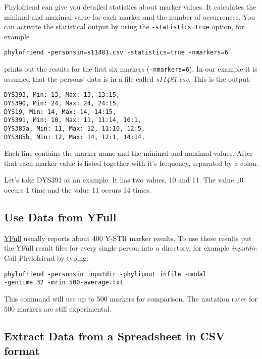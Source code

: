 Phylofriend can give you detailed statistics about marker
values. It calculates the minimal and maximal value for each
marker and the number of occurrences. You can activate the
statistical output by using the \texttt{-statistics=true}
option, for example

\vspace{1ex}
\noindent\texttt{phylofriend -personsin=s11481.csv -statistics=true -nmarkers=6}
\vspace{1ex}

\noindent prints out the results for the first six markers
(\texttt{-nmarkers=6}). In our example it is assumed that
the persons' data is in a file called \emph{s11481.csv}.
This is the output:

\begin{verbatim}
DYS393, Min: 13, Max: 13, 13:15,
DYS390, Min: 24, Max: 24, 24:15,
DYS19, Min: 14, Max: 14, 14:15,
DYS391, Min: 10, Max: 11, 11:14, 10:1,
DYS385a, Min: 11, Max: 12, 11:10, 12:5,
DYS385b, Min: 12, Max: 14, 12:1, 14:14,
\end{verbatim}

\noindent
Each line contains the marker name and the minimal and
maximal values. After that each marker value is listed
together with it's frequency, separated by a colon.

Let's take DYS391 as an example. It has two values,
10 and 11. The value 10 occurs 1 time and the value
11 occurs 14 times.


\subsection{Use Data from YFull}

\href{http://yfull.com/}{YFull} usually reports about 400
Y-STR marker results. To use these results put the YFull 
result files for every single person into a directory, for
example \emph{inputdir}. Call Phylofriend by typing:

\vspace{1ex}
\noindent\texttt{phylofriend -personsin inputdir -phylipout infile -modal\\
-gentime 32 -mrin 500-average.txt}
\vspace{1ex}

\noindent
This command will use up to 500 markers for comparison. The
mutation rates for 500 markers are still experimental.


\subsection{Extract Data from a Spreadsheet in CSV format}

